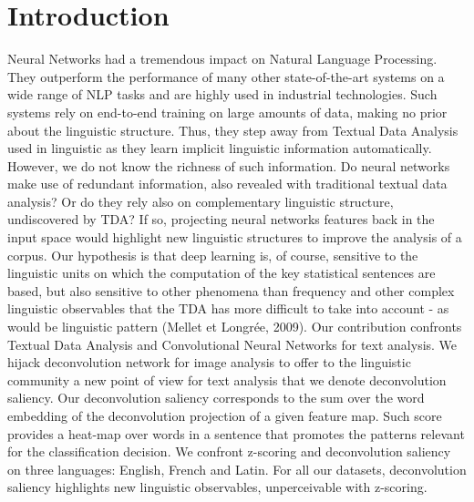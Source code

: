 \section{Introduction}

Neural Networks had a tremendous impact on Natural Language Processing. 
They outperform the performance of many other state-of-the-art systems on a wide range of NLP tasks 
and are highly used in industrial technologies. Such systems rely on end-to-end training on large amounts of data, 
making no prior about the linguistic structure. Thus, they step away from Textual Data Analysis used in linguistic as 
they learn implicit linguistic information automatically. However, we do not know the richness of such information. 
Do neural networks make use of redundant information, also revealed with traditional textual data analysis? 
Or do they rely also on complementary linguistic structure, undiscovered by TDA? If so, projecting neural networks 
features back in the input space would highlight new linguistic structures to improve the analysis of a corpus. 
Our hypothesis is that deep learning is, of course, sensitive to the linguistic units on which the computation of the 
key statistical sentences are based, but also sensitive to other phenomena than frequency and other complex linguistic 
observables that the TDA has more difficult to take into account - as would be linguistic pattern (Mellet et Longrée, 2009).
Our contribution confronts Textual Data Analysis and Convolutional Neural Networks for text analysis. 
We hijack deconvolution network for image analysis to offer to the linguistic community a new point of view for text analysis 
that we denote deconvolution saliency. Our deconvolution saliency corresponds to the sum over the 
word embedding of the deconvolution projection of a given feature map. Such score provides a heat-map over 
words in a sentence that promotes the patterns relevant for the classification decision.
We confront z-scoring and deconvolution saliency on three languages: English, 
French and Latin. For all our datasets, deconvolution saliency highlights new linguistic observables, unperceivable with z-scoring.



